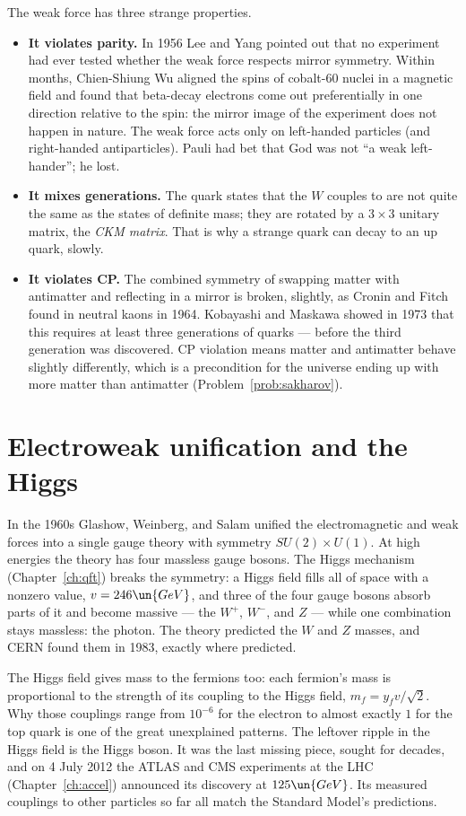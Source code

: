 The weak force has three strange properties.
\begin{itemize}[itemsep=4pt]
  \item \textbf{It violates parity.} In 1956 Lee and Yang pointed out that no experiment had ever tested whether the weak force respects mirror symmetry. Within months, Chien-Shiung Wu aligned the spins of cobalt-60 nuclei in a magnetic field and found that beta-decay electrons come out preferentially in one direction relative to the spin: the mirror image of the experiment does not happen in nature. The weak force acts only on left-handed particles (and right-handed antiparticles). Pauli had bet that God was not ``a weak left-hander''; he lost.
  \item \textbf{It mixes generations.} The quark states that the $W$ couples to are not quite the same as the states of definite mass; they are rotated by a $3\times3$ unitary matrix, the \emph{CKM matrix}. That is why a strange quark can decay to an up quark, slowly.
  \item \textbf{It violates CP.} The combined symmetry of swapping matter with antimatter and reflecting in a mirror is broken, slightly, as Cronin and Fitch found in neutral kaons in 1964. Kobayashi and Maskawa showed in 1973 that this requires at least three generations of quarks --- before the third generation was discovered. CP violation means matter and antimatter behave slightly differently, which is a precondition for the universe ending up with more matter than antimatter (Problem~\ref{prob:sakharov}).
\end{itemize}

\section{Electroweak unification and the Higgs}

In the 1960s Glashow, Weinberg, and Salam unified the electromagnetic and weak forces into a single gauge theory with symmetry $SU(2)\times U(1)$. At high energies the theory has four massless gauge bosons. The Higgs mechanism (Chapter~\ref{ch:qft}) breaks the symmetry: a Higgs field fills all of space with a nonzero value, $v = 246\un{GeV}$, and three of the four gauge bosons absorb parts of it and become massive --- the $W^+$, $W^-$, and $Z$ --- while one combination stays massless: the photon. The theory predicted the $W$ and $Z$ masses, and CERN found them in 1983, exactly where predicted.

The Higgs field gives mass to the fermions too: each fermion's mass is proportional to the strength of its coupling to the Higgs field, $m_f = y_fv/\sqrt2$. Why those couplings range from $10^{-6}$ for the electron to almost exactly $1$ for the top quark is one of the great unexplained patterns. The leftover ripple in the Higgs field is the Higgs boson. It was the last missing piece, sought for decades, and on 4 July 2012 the ATLAS and CMS experiments at the LHC (Chapter~\ref{ch:accel}) announced its discovery at $125\un{GeV}$. Its measured couplings to other particles so far all match the Standard Model's predictions.


